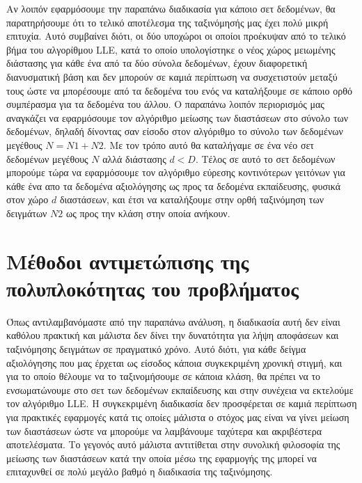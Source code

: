 \par
Αν λοιπόν εφαρμόσουμε την παραπάνω διαδικασία για κάποιο σετ δεδομένων, θα παρατηρήσουμε ότι το τελικό αποτέλεσμα της ταξινόμησής μας έχει πολύ μικρή επιτυχία. Αυτό συμβαίνει διότι, οι δύο υποχώροι οι οποίοι προέκυψαν από το τελικό βήμα του αλγορίθμου \textlatin{LLE}, κατά το οποίο υπολογίστηκε ο νέος χώρος μειωμένης διάστασης για κάθε ένα από τα δύο σύνολα δεδομένων, έχουν διαφορετική διανυσματική βάση και δεν μπορούν σε καμιά περίπτωση να συσχετιστούν μεταξύ τους ώστε να μπορέσουμε από τα δεδομένα του ενός να καταλήξουμε σε κάποιο ορθό συμπέρασμα για τα δεδομένα του άλλου. Ο παραπάνω λοιπόν περιορισμός μας αναγκάζει να εφαρμόσουμε τον αλγόριθμο μείωσης των διαστάσεων στο σύνολο των δεδομένων, δηλαδή δίνοντας σαν είσοδο στον αλγόριθμο το σύνολο των δεδομένων μεγέθους $N = N1+N2$. Με τον τρόπο αυτό θα καταλήγαμε σε ένα νέο σετ δεδομένων μεγέθους $N$ αλλά διάστασης $d < D$. Τέλος σε αυτό το σετ δεδομένων μπορούμε τώρα να εφαρμόσουμε τον αλγόριθμο εύρεσης κοντινότερων γειτόνων για κάθε ένα απο τα δεδομένα αξιολόγησης ως προς τα δεδομένα εκπαίδευσης, φυσικά στον χώρο $d$ διαστάσεων, και έτσι να καταλήξουμε στην ορθή ταξινόμηση των δειγμάτων $N2$ ως προς την κλάση στην οποία ανήκουν. 

\section{Μέθοδοι αντιμετώπισης της πολυπλοκότητας του προβλήματος}
\par
Όπως αντιλαμβανόμαστε από την παραπάνω ανάλυση, η διαδικασία αυτή δεν είναι καθόλου πρακτική και μάλιστα δεν δίνει την δυνατότητα για λήψη αποφάσεων και ταξινόμησης δειγμάτων σε πραγματικό χρόνο. Αυτό διότι, για κάθε δείγμα αξιολόγησης που μας έρχεται ως είσοδος κάποια συγκεκριμένη χρονική στιγμή, και για το οποίο θέλουμε να το ταξινομήσουμε σε κάποια κλάση, θα πρέπει να το ενσωματώνουμε στο σετ των δεδομένων εκπαίδευσης και στην συνέχεια να εκτελούμε τον αλγόριθμο \textlatin{LLE}. Η συγκεκριμένη διαδικασία δεν προσφέρεται σε καμιά περίπτωση για πρακτικές εφαρμογές κατά τις οποίες μάλιστα ο στόχος μας είναι να γίνει μείωση των διαστάσεων ώστε να μπορούμε να λαμβάνουμε ταχύτερα και ακριβέστερα αποτελέσματα. Το γεγονός αυτό μάλιστα αντιτίθεται στην συνολική φιλοσοφία της μείωσης των διαστάσεων κατά την οποία μέσω της εφαρμογής της μπορεί να επιταχυνθεί σε πολύ μεγάλο βαθμό η διαδικασία της ταξινόμησης.

